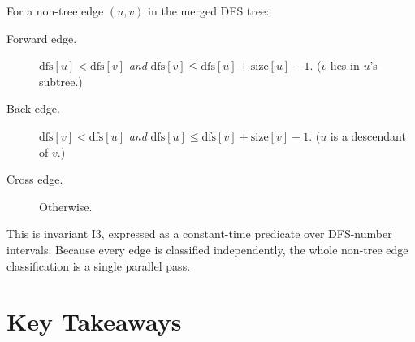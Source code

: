 \begin{ppdefn}
For a non-tree edge $(u, v)$ in the merged DFS tree:
\begin{description}
  \item[Forward edge.]
        $\mathrm{dfs}[u] < \mathrm{dfs}[v]$ \emph{and}
        $\mathrm{dfs}[v] \le \mathrm{dfs}[u] + \mathrm{size}[u] - 1$.
        ($v$ lies in $u$'s subtree.)
  \item[Back edge.]
        $\mathrm{dfs}[v] < \mathrm{dfs}[u]$ \emph{and}
        $\mathrm{dfs}[u] \le \mathrm{dfs}[v] + \mathrm{size}[v] - 1$.
        ($u$ is a descendant of $v$.)
  \item[Cross edge.] Otherwise.
\end{description}
\end{ppdefn}

This is invariant I3, expressed as a constant-time predicate over
DFS-number intervals.
Because every edge is classified independently, the whole non-tree edge
classification is a single parallel pass.

\section*{Key Takeaways}

